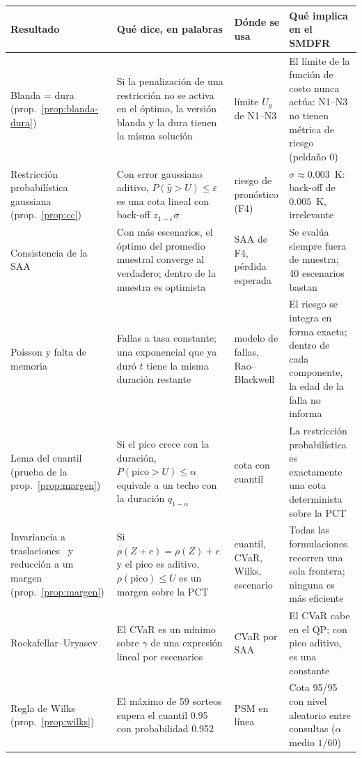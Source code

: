 \begin{table}[H]\centering\scriptsize\setlength{\tabcolsep}{3pt}
\begin{tabularx}{\linewidth}{@{}>{\raggedright\arraybackslash}p{30mm} Y >{\raggedright\arraybackslash}p{22mm} Y@{}}\toprule
Resultado & Qué dice, en palabras & Dónde se usa & Qué implica en el SMDFR\\\midrule
Blanda = dura (prop.~\ref{prop:blanda-dura}) & Si la penalización de una restricción no se activa en el óptimo, la versión blanda y la dura tienen la misma solución & límite $U_y$ de N1--N3 & El límite de la función de costo nunca actúa: N1--N3 no tienen métrica de riesgo (peldaño 0)\\
Restricción probabilística gaussiana (prop.~\ref{prop:cc}) & Con error gaussiano aditivo, $P(\hat y>U)\le\varepsilon$ es una cota lineal con back-off $z_{1-\varepsilon}\sigma$ & riesgo de pronóstico (F4) & $\sigma\approx0.003$~K: back-off de $0.005$~K, irrelevante\\
Consistencia de la SAA~\cite{shapiro2009} & Con más escenarios, el óptimo del promedio muestral converge al verdadero; dentro de la muestra es optimista & SAA de F4, pérdida esperada & Se evalúa siempre fuera de muestra; 40 escenarios bastan\\
Poisson y falta de memoria & Fallas a tasa constante; una exponencial que ya duró $t$ tiene la misma duración restante & modelo de fallas, Rao--Blackwell & El riesgo se integra en forma exacta; dentro de cada componente, la edad de la falla no informa\\
Lema del cuantil (prueba de la prop.~\ref{prop:margen}) & Si el pico crece con la duración, $P(\text{pico}>U)\le\alpha$ equivale a un techo con la duración $q_{1-\alpha}$ & cota con cuantil & La restricción probabilística es exactamente una cota determinista sobre la PCT\\
Invariancia a traslaciones~\cite{artzner1999} y reducción a un margen (prop.~\ref{prop:margen}) & Si $\rho(Z+c)=\rho(Z)+c$ y el pico es aditivo, $\rho(\text{pico})\le U$ es un margen sobre la PCT & cuantil, CVaR, Wilks, escenario & Todas las formulaciones recorren una sola frontera; ninguna es más eficiente\\
Rockafellar--Uryasev~\cite{rockafellar2000} & El CVaR es un mínimo sobre $\gamma$ de una expresión lineal por escenarios & CVaR por SAA & El CVaR cabe en el QP; con pico aditivo, es una constante\\
Regla de Wilks (prop.~\ref{prop:wilks}) & El máximo de 59 sorteos supera el cuantil 0.95 con probabilidad 0.952 & PSM en línea & Cota 95/95 con nivel aleatorio entre consultas ($\alpha$ medio $1/60$)\\

\end{tabularx}
\end{table}
